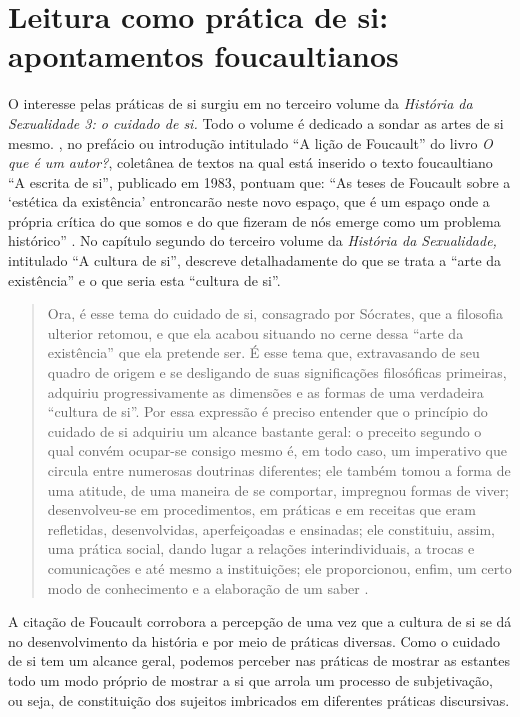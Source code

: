 \section{Leitura como prática de si: apontamentos foucaultianos}\label{sec-leituracomopraticadesiapontamentosfoucaultianos}

O interesse pelas práticas de si surgiu em \textcite{foucault2014historia} no terceiro volume
da \textit{História da Sexualidade 3: o cuidado de si.} Todo o volume é
dedicado a sondar as artes de si mesmo. \textcite{miranda2006licao}, no
prefácio ou introdução intitulado \enquote{A lição de Foucault} do livro
\textit{O que é um autor?}, coletânea de textos na qual está inserido o
texto foucaultiano \enquote{A escrita de si}, publicado em 1983, pontuam que:
\enquote{As teses de Foucault sobre a `estética da existência' entroncarão
neste novo espaço, que é um espaço onde a própria crítica do que somos e
do que fizeram de nós emerge como um problema histórico} \cite[p. 11]{miranda2006licao}. No capítulo segundo do terceiro volume da
\textit{História da Sexualidade,} intitulado \enquote{A cultura de si}, \textcite{foucault2014historia}
descreve detalhadamente do que se trata a \enquote{arte da existência} e o que
seria esta \enquote{cultura de si}.

\begin{quote}
Ora, é esse tema do cuidado de si, consagrado por Sócrates, que a
filosofia ulterior retomou, e que ela acabou situando no cerne dessa
\enquote{arte da existência} que ela pretende ser. É esse tema que,
extravasando de seu quadro de origem e se desligando de suas
significações filosóficas primeiras, adquiriu progressivamente as
dimensões e as formas de uma verdadeira \enquote{cultura de si}. Por essa
expressão é preciso entender que o princípio do cuidado de si adquiriu
um alcance bastante geral: o preceito segundo o qual convém ocupar-se
consigo mesmo é, em todo caso, um imperativo que circula entre numerosas
doutrinas diferentes; ele também tomou a forma de uma atitude, de uma
maneira de se comportar, impregnou formas de viver; desenvolveu-se em
procedimentos, em práticas e em receitas que eram refletidas,
desenvolvidas, aperfeiçoadas e ensinadas; ele constituiu, assim, uma
prática social, dando lugar a relações interindividuais, a trocas e
comunicações e até mesmo a instituições; ele proporcionou, enfim, um
certo modo de conhecimento e a elaboração de um saber \cite[p. 58]{foucault2014historia}.
\end{quote}

A citação de Foucault corrobora a percepção de \textcite{miranda2006licao} uma vez que a cultura de si se dá no desenvolvimento da história e por meio de
práticas diversas. Como o cuidado de si tem um alcance geral, podemos
perceber nas práticas de mostrar as estantes todo um modo próprio de
mostrar a si que arrola um processo de subjetivação, ou seja, de
constituição dos sujeitos imbricados em diferentes práticas discursivas.

